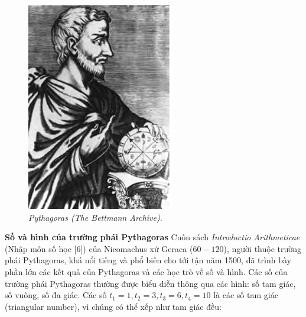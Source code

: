 \begin{multicols}{2}
\begin{figure}[H]
		\vspace*{-5pt}
		\centering
		\captionsetup{labelformat= empty, justification=centering}
		\includegraphics[width= 0.7\linewidth]{4}
		\caption{\small\textit{\color{lichsutoanhoc}Pythagoras (The Bettmann Archive).}}
		\vspace*{-10pt}
	\end{figure}
	\textbf{\color{lichsutoanhoc}Số và hình của trường phái Pythagoras}
	\vskip 0.05cm
	Cuốn sách \textit{Introductio Arithmeticae} (Nhập môn số học [$6$]) của Nicomachus xứ Geraca ($60-120$), người thuộc trường phái Pythagoras, khá nổi tiếng và phổ biến cho tới tận năm 1500, đã trình bày phần lớn các kết quả của Pythagoras và các học trò về số và hình.  
	\vskip 0.05cm
	Các số của trường phái Pythagoras thường được biểu diễn thông qua các hình: số tam giác, số vuông, số đa giác.
	\vskip 0.1cm
	Các số $t_1 =1, t_2 = 3, t_3 = 6, t_4 = 10$ là các số tam giác (triangular number), vì chúng có thể xếp như tam giác đều:  
	\begin{figure}[H]
		\vspace*{-5pt}
		\centering
		\captionsetup{labelformat= empty, justification=centering}

\end{figure}
\end{multicols}
